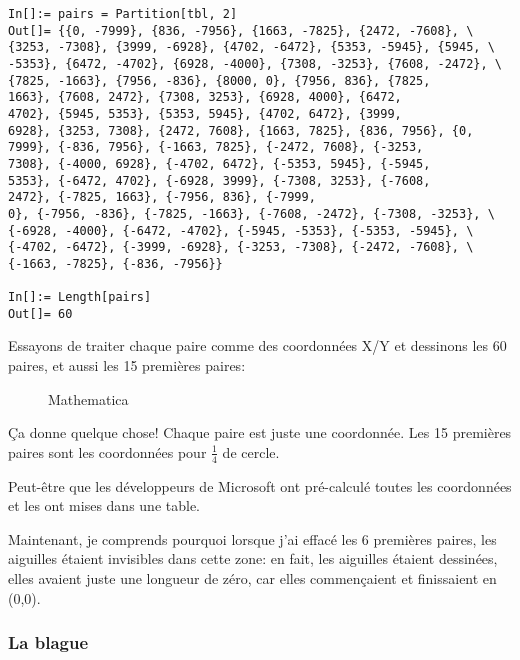 \begin{lstlisting}[style=custommath]
In[]:= pairs = Partition[tbl, 2]
Out[]= {{0, -7999}, {836, -7956}, {1663, -7825}, {2472, -7608}, \
{3253, -7308}, {3999, -6928}, {4702, -6472}, {5353, -5945}, {5945, \
-5353}, {6472, -4702}, {6928, -4000}, {7308, -3253}, {7608, -2472}, \
{7825, -1663}, {7956, -836}, {8000, 0}, {7956, 836}, {7825, 
1663}, {7608, 2472}, {7308, 3253}, {6928, 4000}, {6472, 
4702}, {5945, 5353}, {5353, 5945}, {4702, 6472}, {3999, 
6928}, {3253, 7308}, {2472, 7608}, {1663, 7825}, {836, 7956}, {0, 
7999}, {-836, 7956}, {-1663, 7825}, {-2472, 7608}, {-3253, 
7308}, {-4000, 6928}, {-4702, 6472}, {-5353, 5945}, {-5945, 
5353}, {-6472, 4702}, {-6928, 3999}, {-7308, 3253}, {-7608, 
2472}, {-7825, 1663}, {-7956, 836}, {-7999, 
0}, {-7956, -836}, {-7825, -1663}, {-7608, -2472}, {-7308, -3253}, \
{-6928, -4000}, {-6472, -4702}, {-5945, -5353}, {-5353, -5945}, \
{-4702, -6472}, {-3999, -6928}, {-3253, -7308}, {-2472, -7608}, \
{-1663, -7825}, {-836, -7956}}

In[]:= Length[pairs]
Out[]= 60
\end{lstlisting}

Essayons de traiter chaque paire comme des coordonnées X/Y et dessinons les 60 paires,
et aussi les 15 premières paires:

\begin{figure}[H]
\centering
{}
\caption{Mathematica}
\end{figure}

Ça donne quelque chose!
Chaque paire est juste une coordonnée.
Les 15 premières paires sont les coordonnées pour $\frac{1}{4}$ de cercle.

Peut-être que les développeurs de Microsoft ont pré-calculé toutes les coordonnées
et les ont mises dans une table.

Maintenant, je comprends pourquoi lorsque j'ai effacé les 6 premières paires, les
aiguilles étaient invisibles dans cette zone: en fait, les aiguilles étaient dessinées,
elles avaient juste une longueur de zéro, car elles commençaient et finissaient en (0,0).

\subsubsection{La blague}

